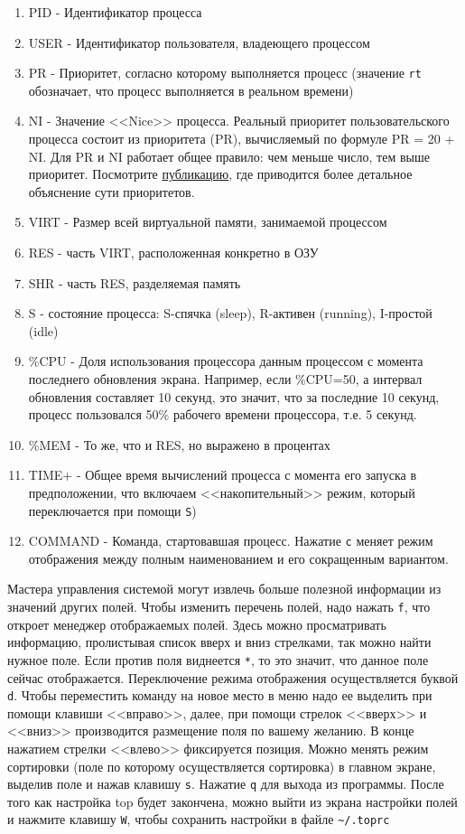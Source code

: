 \documentclass[12pt]{article}
\providecommand{\tightlist}{%
  \setlength{\itemsep}{0pt}\setlength{\parskip}{0pt}}
\begin{document}
\begin{enumerate}
\tightlist
\item
  PID - Идентификатор процесса
\item
  USER - Идентификатор пользователя, владеющего процессом
\item
  PR - Приоритет, согласно которому выполняется процесс (значение
  \texttt{rt} обозначает, что процесс выполняется в реальном времени)
\item
  NI - Значение <<Nice>> процесса. Реальный приоритет пользовательского
  процесса состоит из приоритета (PR), вычисляемый по формуле PR = 20 +
  NI. Для PR и NI работает общее правило: чем меньше число, тем выше
  приоритет. Посмотрите
  \href{https://askubuntu.com/a/656787/917201}{публикацию}, где
  приводится более детальное объяснение сути приоритетов.
\item
  VIRT - Размер всей виртуальной памяти, занимаемой процессом
\item
  RES - часть VIRT, расположенная конкретно в ОЗУ
\item
  SHR - часть RES, разделяемая память
\item
  S - состояние процесса: S-спячка (sleep), R-активен (running),
  I-простой (idle)
\item
  \%CPU - Доля использования процессора данным процессом с момента
  последнего обновления экрана. Например, если \%CPU=50, а интервал
  обновления составляет 10 секунд, это значит, что за последние 10
  секунд, процесс пользовался 50\% рабочего времени процессора, т.е. 5
  секунд.
\item
  \%MEM - То же, что и RES, но выражено в процентах
\item
  TIME+ - Общее время вычислений процесса с момента его запуска в
  предположении, что включаем <<накопительный>> режим, который
  переключается при помощи \texttt{S})
\item
  COMMAND - Команда, стартовавшая процесс. Нажатие \texttt{c} меняет
  режим отображения между полным наименованием и его сокращенным
  вариантом.
\end{enumerate}

Мастера управления системой могут извлечь больше полезной информации из
значений других полей. Чтобы изменить перечень полей, надо нажать
\texttt{f}, что откроет менеджер отображаемых полей. Здесь можно
просматривать информацию, пролистывая список вверх и вниз стрелками, так
можно найти нужное поле. Если против поля виднеется \texttt{*}, то это
значит, что данное поле сейчас отображается. Переключение режима
отображения осуществляется буквой \texttt{d}. Чтобы переместить команду
на новое место в меню надо ее выделить при помощи клавиши <<вправо>>,
далее, при помощи стрелок <<вверх>> и <<вниз>> производится размещение поля
по вашему желанию. В конце нажатием стрелки <<влево>> фиксируется позиция.
Можно менять режим сортировки (поле по которому осуществляется
сортировка) в главном экране, выделив поле и нажав клавишу \texttt{s}.
Нажатие \texttt{q} для выхода из программы. После того как настройка top
будет закончена, можно выйти из экрана настройки полей и нажмите клавишу
\texttt{W}, чтобы сохранить настройки в файле
\texttt{\textasciitilde{}/.toprc}
\end{document}
